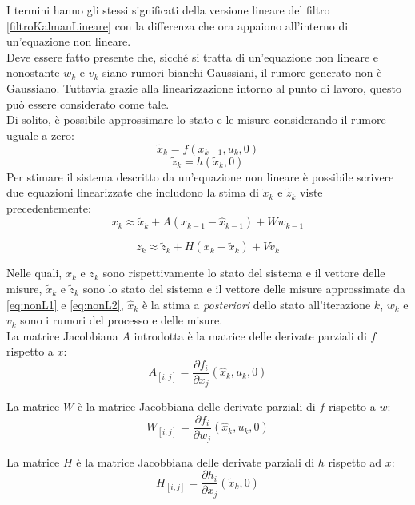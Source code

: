 I termini hanno gli stessi significati della versione lineare del filtro \ref{filtroKalmanLineare} con la differenza che ora appaiono all'interno di un'equazione non lineare.\\
Deve essere fatto presente che, sicché si tratta di un'equazione non lineare e nonostante  $w_k$ e $v_k$ siano rumori bianchi Gaussiani, il rumore generato non è Gaussiano. Tuttavia grazie alla linearizzazione intorno al punto di lavoro, questo può essere considerato come tale.\\
Di solito, è possibile approssimare lo stato e le misure considerando il rumore uguale a zero:
\begin{equation}
\label{eq:nonL1}
\tilde{x}_k = f(x_{k-1},u_k,0)
\end{equation}
\begin{equation}
\label{eq:nonL2}
\tilde{z}_k = h(\tilde{x}_k,0)
\end{equation}
Per stimare il sistema descritto da un'equazione non lineare è possibile scrivere due equazioni linearizzate che includono la stima di $\tilde{x}_k$ e $\tilde{z}_k$ viste precedentemente:
\begin{equation}
	x_k \approx \tilde{x}_k + A(x_{k-1} - \hat{x}_{k-1}) + Ww_{k-1}
\end{equation}

\begin{equation}
z_k \approx \tilde{z}_k + H(x_k - \tilde{x}_k) + Vv_k
\end{equation}

Nelle quali, $x_k$ e $z_k$ sono rispettivamente lo stato del sistema e il vettore delle misure, $\tilde{x}_k$ e $\tilde{z}_k$ sono lo stato del sistema e il vettore delle misure approssimate da \ref{eq:nonL1} e \ref{eq:nonL2}, $\hat{x}_k$ è la stima a \textit{posteriori} dello stato all'iterazione $k$, $w_k$ e $v_k$ sono i rumori del processo e delle misure.\\
La matrice Jacobbiana $A$ introdotta è la matrice delle derivate parziali di $f$ rispetto a $x$:
\begin{equation}
A_{[i,j]} = \dfrac{\partial f_{i}}{\partial x_j} ( \hat{x}_k,u_k,0)
\end{equation}

La matrice $W$ è la matrice Jacobbiana delle derivate parziali di $f$ rispetto a $w$:
\begin{equation}
W_{[i,j]} = \dfrac{\partial f_{i}}{\partial w_j} ( \hat{x}_k,u_k,0)
\end{equation}

La matrice $H$ è la matrice Jacobbiana delle derivate parziali di $h$ rispetto ad $x$:
\begin{equation}
H_{[i,j]} = \dfrac{\partial h_{i}}{\partial x_j} ( \tilde{x}_k,0)
\end{equation}

